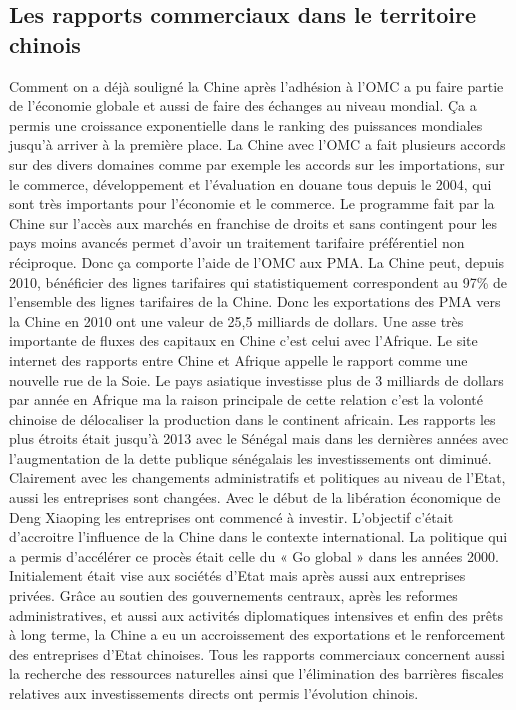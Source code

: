 \subsection{Les rapports commerciaux dans le territoire chinois}
Comment on a déjà souligné la Chine après l’adhésion à l’OMC a pu faire partie de l’économie globale et aussi de faire des échanges au niveau mondial. Ça a permis une croissance exponentielle dans le ranking des puissances mondiales jusqu’à arriver à la première place.  
La Chine avec l’OMC a fait plusieurs accords sur des divers domaines comme par exemple les accords sur les importations, sur le commerce, développement et l’évaluation en douane tous depuis le 2004, qui sont très importants pour l’économie et le commerce.
Le programme fait par la Chine sur l’accès aux marchés en franchise de droits et sans contingent pour les pays moins avancés permet d’avoir un traitement tarifaire préférentiel non réciproque. Donc ça comporte l’aide de l’OMC aux PMA. La Chine peut, depuis 2010, bénéficier des lignes tarifaires qui statistiquement correspondent au 97\% de l’ensemble des lignes tarifaires de la Chine. Donc les exportations des PMA vers la Chine en 2010 ont une valeur de 25,5 milliards de dollars. 
Une asse très importante de fluxes des capitaux en Chine c’est celui avec l’Afrique. Le site internet des rapports entre Chine et Afrique appelle le rapport comme une nouvelle rue de la Soie. Le pays asiatique investisse plus de 3 milliards de dollars par année en Afrique ma la raison principale de cette relation c’est la volonté chinoise de délocaliser la production dans le continent africain. Les rapports les plus étroits était jusqu’à 2013 avec le Sénégal mais dans les dernières années avec l’augmentation de la dette publique sénégalais les investissements ont diminué. 
Clairement avec les changements administratifs et politiques au niveau de l’Etat, aussi les entreprises sont changées. Avec le début de la libération économique de Deng Xiaoping les entreprises ont commencé à investir. L’objectif c’était d’accroitre l’influence de la Chine dans le contexte international. La politique qui a permis d’accélérer ce procès était celle du « Go global » dans les années 2000. Initialement était vise aux sociétés d’Etat mais après aussi aux entreprises privées. Grâce au soutien des gouvernements centraux, après les reformes administratives, et aussi aux activités diplomatiques intensives et enfin des prêts à long terme, la Chine a eu un accroissement des exportations et le renforcement des entreprises d’Etat chinoises. Tous les rapports commerciaux concernent aussi la recherche des ressources naturelles ainsi que l’élimination des barrières fiscales relatives aux investissements directs ont permis l’évolution chinois. 
